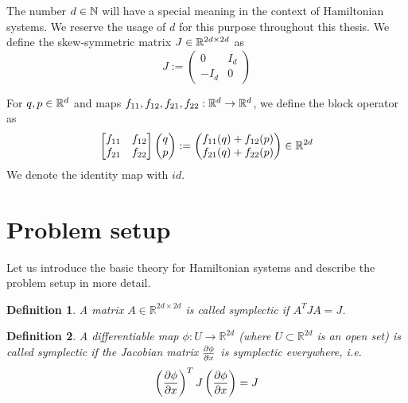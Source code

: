\documentclass[twoside,a4paper]{article}
\newtheorem{definition}{Definition}
\begin{document}
The number $d \in \mathbb{N}$ will have a special meaning in the context of Hamiltonian systems.
We reserve the usage of $d$ for this purpose throughout this thesis. We define 
the skew-symmetric matrix $J \in \mathbb{R}^{2d \times 2d}$ as
\begin{equation*}
	J := \begin{pmatrix}
		0 & I_d \\
		-I_d & 0
	\end{pmatrix}
\end{equation*}

For $q,p \in \mathbb{R}^{d}$ and maps $f_{11}, f_{12}, f_{21}, f_{22} : \mathbb{R}^d \to \mathbb{R}^d$,
we define the block operator as
\begin{equation*}
	\begin{bmatrix}
		f_{11} & f_{12} \\
		f_{21} & f_{22}
	\end{bmatrix}
	\begin{pmatrix} q \\ p \end{pmatrix}
	:= \begin{pmatrix}
		f_{11}(q) + f_{12}(p) \\
		f_{21}(q) + f_{22}(p)
	\end{pmatrix} \in \mathbb{R}^{2d}
\end{equation*}
We denote the identity map with $id$.


%
%
\newpage
\section{Problem setup}\label{sec_problem_setup}
Let us introduce the basic theory for Hamiltonian systems and describe the problem
setup in more detail.

\begin{definition}
	A matrix $A \in \mathbb{R}^{2d \times 2d}$ is called symplectic if $A^TJA=J$.
\end{definition}

\begin{definition}
	A differentiable map $\phi : U \to \mathbb{R}^{2d}$ (where $U \subset \mathbb{R}^{2d}$ is an open set)
	is called symplectic if the Jacobian matrix $\frac{\partial \phi}{\partial x}$ is symplectic everywhere, i.e.
	\begin{equation*}
		\left( \frac{\partial \phi}{\partial x} \right)^T J \left( \frac{\partial \phi}{\partial x} \right) = J
	\end{equation*}
\end{definition}
\end{document}
